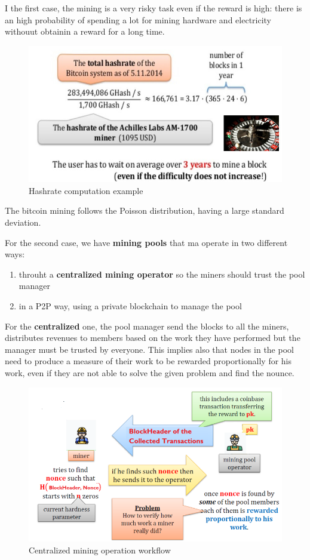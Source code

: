 \documentclass[10pt,a4paper]{report}
\begin{document}
I the first case, the mining is a very risky task even if the reward is high: there is an high probability of spending a lot for mining hardware and electricity withouut obtainin a reward  for a long time.
\begin{figure}[h]
	\centering
	\includegraphics[scale=0.50]{images/Pasted image 20230412121738.png}	\caption{Hashrate computation example}
\end{figure}


The bitcoin mining follows the Poisson distribution, having a large standard deviation.

For the second case, we have \textbf{mining pools} that ma operate in two different ways:
\begin{enumerate}
	\item 
	throuht a \textbf{centralized mining operator} so the miners should trust the pool manager
	\item 
	in a P2P way, using a private blockchain to manage the pool
\end{enumerate}

For the \textbf{centralized} one, the pool manager send the blocks to all the miners, distributes revenues to members based on the work they have performed but the manager must be trusted by everyone. This implies also that nodes in the pool need to produce a measure of their work to be rewarded proportionally for his work, even if they are not able to solve the given problem and find the nounce.

\begin{figure}[h]
	\centering
	\includegraphics[scale=0.50]{images/Pasted image 20230412122342.png}
	\caption{Centralized mining operation workflow}
\end{figure}
\end{document}
